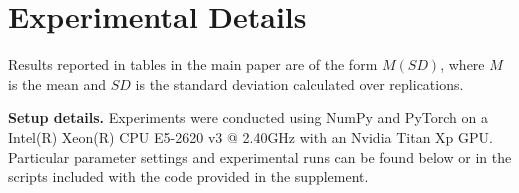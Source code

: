 \section{Experimental Details}
 Results reported in tables in the main paper are of the form $M\scriptscriptstyle{(SD)}$, where $M$ is the mean and $SD$ is the standard deviation calculated over replications.

{\bf Setup details.} Experiments were conducted using NumPy and PyTorch on a Intel(R) Xeon(R) CPU E5-2620 v3 @ 2.40GHz with an Nvidia Titan Xp GPU. Particular parameter settings and experimental runs can be found below or in the scripts included with the code provided in the supplement.

